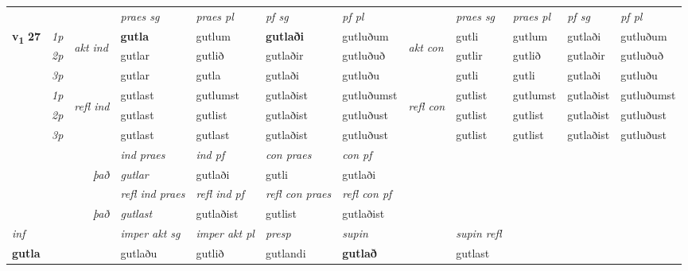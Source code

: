 \begin{longtable}[l]{X>{\footnotesize\itshape}llXXXXlXXXX}
 & &   & \textit{praes sg}  & \textit{praes pl}    & \textit{ pf sg} & \textit{pf pl} & & \textit{praes sg}  & \textit{praes pl}    & \textit{pf sg} & \textit{pf pl }  \\ \cmidrule{4-7} \cmidrule{9-12}
 \multirow{2}{*}{{{\textbf{v{\textsubscript{1}}} \Large{\textbf{27}}}}}  & 1p & \multirow{3}{*}{\begin{turn}{90}\textit{akt ind}\end{turn}} & \textbf{gutla} & gutlum & \textbf{gutlaði} & gutluðum & \multirow{3}{*}{\begin{turn}{90}\textit{akt con}\end{turn}} &gutli & gutlum & gutlaði & gutluðum\\*
 & 2p &  &  gutlar  & gutlið & gutlaðir & gutluðuð & & gutlir & gutlið & gutlaðir & gutluðuð \\*
 & 3p &  & gutlar & gutla & gutlaði & gutluðu & & gutli & gutli& gutlaði & gutluðu \\*
\cmidrule{4-7} \cmidrule{9-12}
 & 1p & \multirow{3}{*}{\begin{turn}{90}\textit{refl ind}\end{turn}}  & gutlast & gutlumst & gutlaðist & gutluðumst & \multirow{3}{*}{\begin{turn}{90}\textit{refl con}\end{turn}}  &gutlist & gutlumst & gutlaðist & gutluðumst \\*
 & 2p &  & gutlast & gutlist & gutlaðist & gutluðust & &gutlist & gutlist & gutlaðist & gutluðust \\*
 & 3p  & & gutlast & gutlast & gutlaðist & gutluðust & & gutlist & gutlist& gutlaðist & gutluðust \\*
\cmidrule{4-7} \cmidrule{9-12}

   && &  \textit{ind praes} & \textit{ind pf} & \textit{con praes} & \textit{con pf} \\*
\multicolumn{3}{r}{\textit{það}} & gutlar & gutlaði & gutli & gutlaði \\*

\cmidrule{4-7}
 & && \textit{refl ind praes} & \textit{refl ind pf} & \textit{refl con praes} & \textit{refl con pf} \\*
\multicolumn{3}{r}{\textit{það}}& gutlast & gutlaðist & gutlist & gutlaðist \\*

\cmidrule{4-7}
   {\textit{inf}} & &  & \textit{imper akt sg} & \textit{imper akt pl}   & \textit{presp} & \textit{supin} && \textit{supin refl}  \\*
  {\textbf{gutla}} & && gutlaðu  & gutlið   & gutlandi &  \textbf{gutlað} && gutlast  \\*


\end{longtable}
